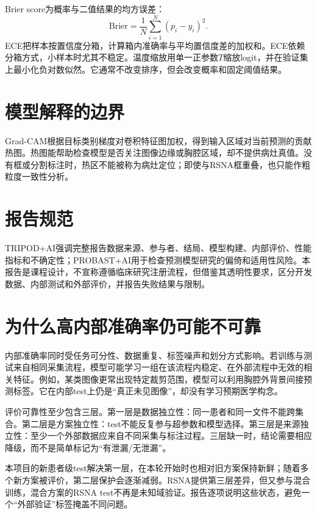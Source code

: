 Brier score为概率与二值结果的均方误差：
\begin{equation}
\mathrm{Brier}=\frac{1}{N}\sum_{i=1}^N(p_i-y_i)^2.
\end{equation}
ECE把样本按置信度分箱，计算箱内准确率与平均置信度差的加权和。ECE依赖分箱方式，小样本时尤其不稳定。温度缩放用单一正参数$T$缩放logit，并在验证集上最小化负对数似然\cite{guo2017calibration}。它通常不改变排序，但会改变概率和固定阈值结果。

\section{模型解释的边界}

Grad-CAM根据目标类别梯度对卷积特征图加权，得到输入区域对当前预测的贡献热图\cite{selvaraju2017gradcam}。热图能帮助检查模型是否关注图像边缘或胸腔区域，却不提供病灶真值。没有框或分割标注时，热区不能被称为病灶定位；即使与RSNA框重叠，也只能作粗粒度一致性分析。

\section{报告规范}

TRIPOD+AI强调完整报告数据来源、参与者、结局、模型构建、内部评价、性能指标和不确定性\cite{collins2024tripod}；PROBAST+AI用于检查预测模型研究的偏倚和适用性风险\cite{moons2025probast}。本报告是课程设计，不宣称遵循临床研究注册流程，但借鉴其透明性要求，区分开发数据、内部测试和外部评价，并报告失败结果与限制。

\section{为什么高内部准确率仍可能不可靠}

内部准确率同时受任务可分性、数据重复、标签噪声和划分方式影响。若训练与测试来自相同采集流程，模型可能学习一组在该流程内稳定、在外部流程中无效的相关特征。例如，某类图像更常出现特定裁剪范围，模型可以利用胸腔外背景间接预测标签。它在内部test上仍是“真正未见图像”，却没有学习预期医学构念。

评价可靠性至少包含三层。第一层是数据独立性：同一患者和同一文件不能跨集合。第二层是方案独立性：test不能反复参与超参数和模型选择。第三层是来源独立性：至少一个外部数据应来自不同采集与标注过程。三层缺一时，结论需要相应降级，而不是简单标记为“有泄漏/无泄漏”。

本项目的新患者级test解决第一层，在本轮开始时也相对旧方案保持新鲜；随着多个新方案被评价，第二层保护会逐渐减弱。RSNA提供第三层差异，但又参与混合训练，混合方案的RSNA test不再是未知域验证。报告逐项说明这些状态，避免一个“外部验证”标签掩盖不同问题。

